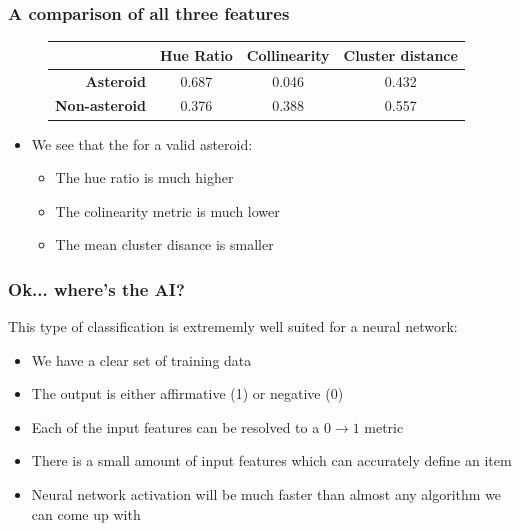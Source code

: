 \documentclass{beamer}
\begin{document}
\begin{frame}
    \frametitle{A comparison of all three features}
    \begin{figure}
    \centering
    \begin{tabular}{|r|c|c|c|}
        \hline
        & \textbf{Hue Ratio} & \textbf{Collinearity} & \textbf{Cluster distance}
        \\\hline
        \textbf{Asteroid} & 0.687 & 0.046 & 0.432\\\hline
        \textbf{Non-asteroid} & 0.376 & 0.388 & 0.557\\\hline
    \end{tabular}
    \end{figure}
    \begin{itemize}
        \item We see that the for a valid asteroid:
        \begin{itemize}
            \item The hue ratio is much higher
            \item The colinearity metric is much lower
            \item The mean cluster disance is smaller
        \end{itemize}
    \end{itemize}
\end{frame}

\begin{frame}
    \frametitle{Ok... where's the AI?}
    This type of classification is extrememly well suited for a neural network:
    \begin{itemize}
        \item We have a clear set of training data
        \item The output is either affirmative (1) or negative (0)
        \item Each of the input features can be resolved to a $0\to 1$ metric
        \item There is a small amount of input features which can accurately
        define an item
        \item Neural network activation will be much faster than almost any
        algorithm we can come up with
    \end{itemize}
\end{frame}
\end{document}
